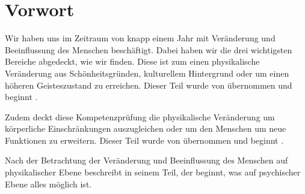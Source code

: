 \chapter{Vorwort}
\label{sec:preface}

Wir haben uns im Zeitraum von knapp einem Jahr mit Veränderung und Beeinflussung des Menschen
beschäftigt.
Dabei haben wir die drei wichtigsten Bereiche abgedeckt, wie wir finden. Diese ist zum einen
physikalische Veränderung aus Schönheitsgründen, kulturellem Hintergrund oder um einen höheren
Geisteszustand zu erreichen. Dieser Teil wurde von  übernommen und beginnt
.

Zudem deckt diese Kompetenzprüfung die physikalische Veränderung um körperliche Einschränkungen
auszugleichen oder um den Menschen um neue Funktionen zu erweitern. Dieser Teil wurde von
 übernommen und beginnt .

Nach der Betrachtung der Veränderung und Beeinflussung des Menschen auf physikalischer Ebene
beschreibt  in seinem Teil, der 
beginnt, was auf psychischer Ebene alles möglich ist.
